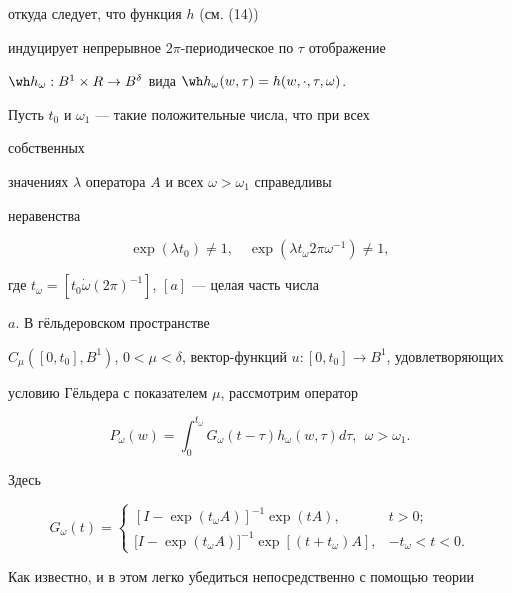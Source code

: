 откуда следует, что функция $h$ (см. (14)) 


индуцирует непрерывное $2\pi$-периодическое по $\tau$ отображение 


$\wh h_\omega:B^1\times R\to B^\delta$ вида $\wh 


h_\omega(w,\tau)=h(w,\cdot,\tau,\omega)$. 


 


Пусть $t_0$ и $\omega_1$ --- такие положительные числа, что при всех 


собственных  


значениях $\lambda$ оператора $A$ и всех $\omega>\omega_1$ справедливы 


неравенства 


$$ 


\exp(\lambda t_0)\ne1,\quad \exp(\lambda t_\omega 


2\pi\omega^{-1})\ne1, 


$$ 


где $t_\omega=[t_0\Dot\omega(2\pi)^{-1}]$, $[a]$ --- целая часть числа 


$a$. В г\"ельдеровском пространстве 


$C_\mu([0,t_0],B^1)$, $0<\mu<\delta$, вектор-функций $u:[0,t_0]\to 


B^1$, удовлетворяющих  


условию Г\"ельдера с показателем $\mu$, рассмотрим оператор 


$$ 


P_\omega(w)=\int^{t_\omega}_0 G_\omega(t-\tau) 


h_\omega(w,\tau)d\tau,\ \ \omega>\omega_1. 


$$ 


Здесь 


$$ 


G_\omega(t)= 


\begin{cases} 


[I-\exp(t_\omega A)]^{-1}\exp(t A), & t>0;\\ 


\lbrack I-\exp(t_\omega A)\rbrack^{-1}\exp[(t+t_\omega)A], & -t_\omega<t<0. 


\end{cases} 


$$ 


 


Как известно, и в этом легко убедиться непосредственно с помощью теории 


